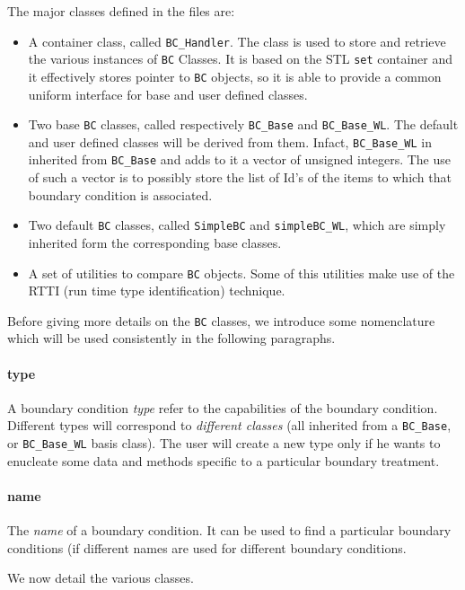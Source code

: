 The major classes defined in the files are:
\begin{itemize}
\item A container class, called \texttt{BC\_Handler}. The class is used to store and
retrieve the various instances of \texttt{BC} Classes. It is based on the STL \texttt{set}
container and it effectively stores pointer to \texttt{BC} objects, so it is able
to provide a common uniform interface for base and user defined classes.
\item Two base \texttt{BC} classes, called respectively
  \texttt{BC\_Base} and \texttt{BC\_Base\_WL}. The default and user
  defined classes will be derived from them.  Infact,
  \texttt{BC\_Base\_WL} in inherited from \texttt{BC\_Base} and adds
  to it a vector of unsigned integers. The use of such a vector is to
  possibly store the list of Id's of the items to which that boundary
  condition is associated.
\item Two default \texttt{BC} classes, called \texttt{SimpleBC} and \texttt{simpleBC\_WL},
which are simply inherited form the corresponding base classes.
\item A set of utilities to compare \texttt{BC} objects. Some of this utilities make
use of the RTTI (run time type identification) technique.
\end{itemize}

Before giving more details on  the \texttt{BC} classes, we introduce some nomenclature
which will be used consistently in the following paragraphs.

\paragraph{type} A boundary condition \emph{type} refer to the capabilities of the
boundary condition. Different types will correspond to \emph{different
  classes} (all inherited from a \texttt{BC\_Base}, or
\texttt{BC\_Base\_WL} basis class). The user will create a new type only
if he wants to enucleate some data and methods specific to a
particular boundary treatment.

\paragraph{name} The \emph{name} of a boundary condition. It can be used to find a particular
boundary conditions (if different names are used for different boundary conditions. 


We now detail the various classes.
